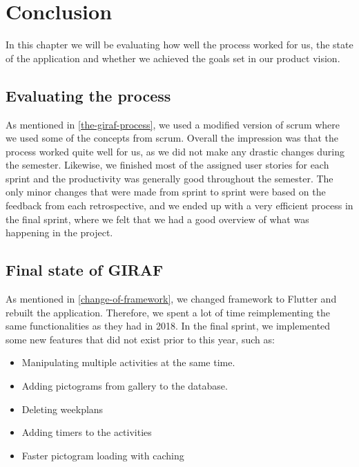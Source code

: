 \chapter{Conclusion}
In this chapter we will be evaluating how well the process worked for us, the state of the application and whether we achieved the goals set in our product vision.

\section{Evaluating the process}
As mentioned in \autoref{the-giraf-process}, we used a modified version of scrum where we used some of the concepts from scrum.
Overall the impression was that the process worked quite well for us, as we did not make any drastic changes during the semester.
Likewise, we finished most of the assigned user stories for each sprint and the productivity was generally good throughout the semester.
The only minor changes that were made from sprint to sprint were based on the feedback from each retrospective, and we ended up with a very efficient process in the final sprint, where we felt that we had a good overview of what was happening in the project.

\section{Final state of GIRAF}
As mentioned in \autoref{change-of-framework}, we changed framework to Flutter and rebuilt the application.
Therefore, we spent a lot of time reimplementing the same functionalities as they had in 2018.
In the final sprint, we implemented some new features that did not exist prior to this year, such as:
\begin{itemize}
    \item Manipulating multiple activities at the same time.
    \item Adding pictograms from gallery to the database.
    \item Deleting weekplans
    \item Adding timers to the activities
    \item Faster pictogram loading with caching
\end{itemize}

